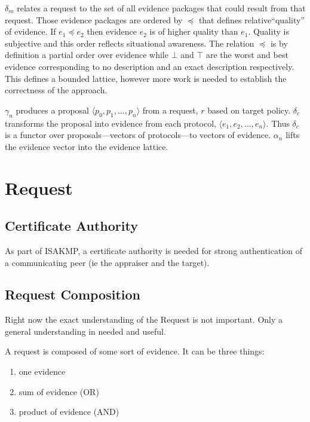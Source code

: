 \documentclass[10pt]{report}
\newcommand{\squash}{\itemsep=0pt\parskip=0pt}
\begin{document}
$\delta_m$ relates a request to the set of all evidence packages that 
could result from that request.  Those evidence packages are ordered
by $\preceq$ that defines relative``quality'' of evidence.  If
$e_1\preceq e_2$ then evidence $e_2$ is of higher quality than $e_1$.
Quality is subjective and this order reflects situational awareness.
The relation $\preceq$ is by definition a partial order 
over evidence while $\bot$ and $\top$ are the worst and best evidence
corresponding to no description and an exact description
respectively.  This defines a bounded lattice, however more work is
needed to establish the correctness of the approach.

$\gamma_n$ produces a proposal $\langle p_0,p_1,\ldots,p_n\rangle$
from a request, $r$ based on target policy. $\delta_c$
transforms the proposal into evidence from each protocol,
$\langle e_1,e_2,\ldots,e_n \rangle$. Thus $\delta_c$ is a functor
over proposals---vectors of protocols---to vectors of evidence.
$\alpha_n$ lifts the evidence vector into the evidence lattice.

\section {Request}

\subsection {Certificate Authority}
  
  As part of ISAKMP, a certificate authority is needed for strong 
  authentication of a communicating peer (ie the appraiser and the
  target). 

\subsection {Request Composition}
  
  Right now the exact understanding of the Request is not important.
  Only a general understanding in needed and useful. 
  
  A request is composed of some sort of evidence. It can be three things:
  \begin{enumerate}
  \squash
  \item one evidence
  \item sum of evidence (OR)
  \item product of evidence (AND)
  \end{enumerate}
\end{document}
